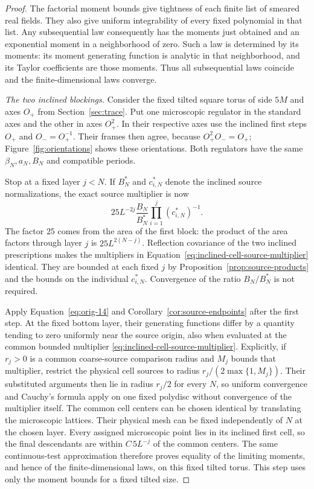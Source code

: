 \begin{proof}
The factorial moment bounds give tightness of each finite list of
smeared real fields.  They also give uniform integrability of every
fixed polynomial in that list.  Any subsequential law consequently
has the moments just obtained and an exponential moment in a
neighborhood of zero.  Such a law is determined by its moments: its
moment generating function is analytic in that neighborhood, and its
Taylor coefficients are those moments.  Thus all subsequential laws
coincide and the finite-dimensional laws converge.



\emph{The two inclined blockings.}
Consider the fixed tilted square torus of side $5M$ and axes $O_+$
from Section~\ref{sec:trace}.  Put one microscopic regulator in the
standard axes and the other in axes $O_+^2$.  In their respective axes
use the inclined first steps $O_+$ and $O_-=O_+^{-1}$.  Their frames
then agree, because $O_+^2O_-=O_+$;
Figure~\ref{fig:orientations} shows these orientations.  Both regulators have the same
$\beta_N,a_N,B_N$ and compatible periods.

Stop at a fixed layer $j<N$.  If $B_N^*$ and $c_{i,N}^*$ denote the
inclined source normalizations, the exact source multiplier is now
\begin{equation}
       25L^{-2j}\frac{B_N}{B_N^*}
                    \prod_{i=1}^j(c_{i,N}^*)^{-1}.
 \label{eq:inclined-cell-source-multiplier}
\end{equation}
The factor $25$ comes from the area of the first block: the product of
the area factors through layer $j$ is $25L^{2(N-j)}$.  Reflection
covariance of the two inclined prescriptions makes the multipliers
in Equation~\eqref{eq:inclined-cell-source-multiplier} identical.
They are bounded at each fixed $j$ by
Proposition~\ref{prop:source-products} and the bounds on the individual
$c_{i,N}^*$.  Convergence of the ratio $B_N/B_N^*$ is not required.

Apply Equation~\eqref{eq:orig-14} and
Corollary~\ref{cor:source-endpoints} after the first step.  At the fixed
bottom layer, their generating functions differ by a quantity tending
to zero uniformly near the source origin, also when evaluated at the
common bounded multiplier
\eqref{eq:inclined-cell-source-multiplier}.  Explicitly, if $r_j>0$
is a common coarse-source comparison radius and $M_j$ bounds that
multiplier, restrict the physical cell sources to radius
$r_j/(2\max\{1,M_j\})$.  Their substituted arguments then lie in
radius $r_j/2$ for every $N$, so uniform convergence and Cauchy's
formula apply on one fixed polydisc without convergence of the
multiplier itself.  The common cell centers can
be chosen identical by translating the microscopic lattices.  Their
physical mesh can be fixed independently of $N$ at the chosen layer.
Every assigned microscopic point lies in its inclined first cell, so
the final descendants are within $C\,5L^{-j}$ of the common centers.
The same continuous-test approximation therefore proves equality of
the limiting moments, and hence of the finite-dimensional laws, on
this fixed tilted torus.  This step uses only the moment bounds for a
fixed tilted size.


\end{proof}
